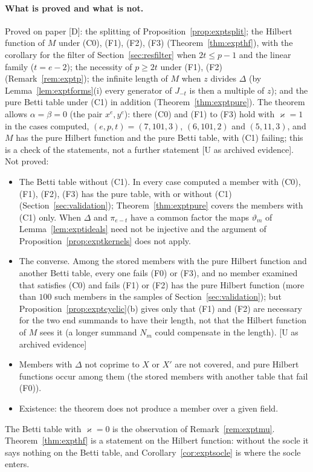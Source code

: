 \documentclass[11pt]{article}
\theoremstyle{definition}
\theoremstyle{remark}
\begin{document}
\paragraph{What is proved and what is not.} Proved on paper [D]: the splitting of Proposition~\ref{prop:exptsplit}; the Hilbert function of $M$ under (C0), (F1), (F2), (F3) (Theorem~\ref{thm:expthf}), with the corollary for the filter of Section~\ref{sec:resfilter} when $2t\le p-1$ and the linear family ($t=e-2$); the necessity of $p\ge2t$ under (F1), (F2) (Remark~\ref{rem:exptp}); the infinite length of $M$ when $z$ divides $\Delta$ (by Lemma~\ref{lem:exptforms}(i) every generator of $J_{-t}$ is then a multiple of $z$); and the pure Betti table under (C1) in addition (Theorem~\ref{thm:exptpure}). The theorem allows $\alpha=\beta=0$ (the pair $x^e,y^e$): there (C0) and (F1) to (F3) hold with $\varkappa=1$ in the cases computed, $(e,p,t)=(7,101,3)$, $(6,101,2)$ and $(5,11,3)$, and $M$ has the pure Hilbert function and the pure Betti table, with (C1) failing; this is a check of the statements, not a further statement [U as archived evidence]. Not proved:
\begin{itemize}
\item The Betti table without (C1). In every case computed a member with (C0), (F1), (F2), (F3) has the pure table, with or without (C1) (Section~\ref{sec:validation}); Theorem~\ref{thm:exptpure} covers the members with (C1) only. When $\Delta$ and $\pi_{e-t}$ have a common factor the maps $\vartheta_m$ of Lemma~\ref{lem:exptideals} need not be injective and the argument of Proposition~\ref{prop:exptkernels} does not apply.
\item The converse. Among the stored members with the pure Hilbert function and another Betti table, every one fails (F0) or (F3), and no member examined that satisfies (C0) and fails (F1) or (F2) has the pure Hilbert function (more than $100$ such members in the samples of Section~\ref{sec:validation}); but Proposition~\ref{prop:exptcyclic}(b) gives only that (F1) and (F2) are necessary for the two end summands to have their length, not that the Hilbert function of $M$ sees it (a longer summand $N_m$ could compensate in the length). [U as archived evidence]
\item Members with $\Delta$ not coprime to $X$ or $X'$ are not covered, and pure Hilbert functions occur among them (the stored members with another table that fail (F0)).
\item Existence: the theorem does not produce a member over a given field.
\end{itemize}
The Betti table with $\varkappa=0$ is the observation of Remark~\ref{rem:exptmu}. Theorem~\ref{thm:expthf} is a statement on the Hilbert function: without the socle it says nothing on the Betti table, and Corollary~\ref{cor:exptsocle} is where the socle enters.
\end{document}
